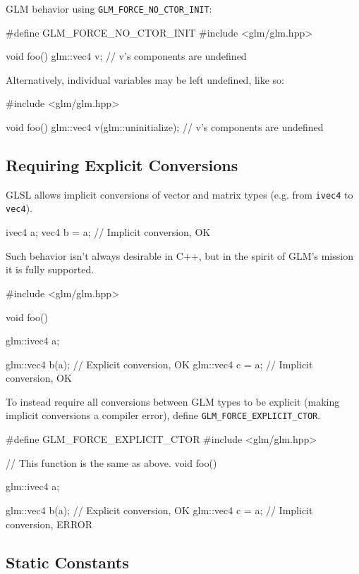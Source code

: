 \documentclass{scrartcl}
\numberwithin{figure}{subsection}
\begin{document}
GLM behavior using \verb|GLM_FORCE_NO_CTOR_INIT|:

\begin{cppcode}
#define GLM_FORCE_NO_CTOR_INIT 
#include <glm/glm.hpp>

void foo()
{
  glm::vec4 v; // v's components are undefined
}
\end{cppcode}

Alternatively, individual variables may be left undefined, like so:

\begin{cppcode}
#include <glm/glm.hpp>

void foo()
{
  glm::vec4 v(glm::uninitialize); // v's components are undefined
}
\end{cppcode}

\subsection{Requiring Explicit Conversions}

GLSL allows implicit conversions of vector and matrix types (e.g. from \verb|ivec4| to \verb|vec4|).

\begin{glslcode}
ivec4 a;
vec4 b = a; // Implicit conversion, OK
\end{glslcode}

Such behavior isn't always desirable in C++, but in the spirit of GLM's mission it is fully supported.

\begin{cppcode}
#include <glm/glm.hpp>

void foo()
{
  glm::ivec4 a;

  glm::vec4 b(a); // Explicit conversion, OK
  glm::vec4 c = a; // Implicit conversion, OK
}
\end{cppcode}

To instead require all conversions between GLM types to be explicit (making implicit conversions a compiler error), define \verb|GLM_FORCE_EXPLICIT_CTOR|.

\begin{cppcode}
#define GLM_FORCE_EXPLICIT_CTOR
#include <glm/glm.hpp>

// This function is the same as above.
void foo()
{
  glm::ivec4 a;

  glm::vec4 b(a); // Explicit conversion, OK
  glm::vec4 c = a; // Implicit conversion, ERROR
}
\end{cppcode}

\subsection{Static Constants}
\end{document}
